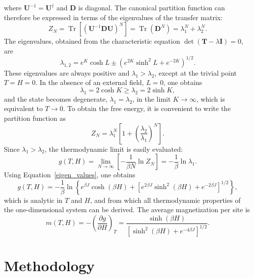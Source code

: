 \documentclass[a4paper]{article}
\begin{document}
where $\mathbf{U}^{-1}=\mathbf{U}^{\dagger}$ and $\mathbf{D}$ is diagonal. The canonical partition function can therefore be expressed in terms of the eigenvalues of the transfer matrix:
\begin{equation}
Z_N=\operatorname{Tr}\left[(\mathbf{U}^{-1}\mathbf{D}\mathbf{U})^N\right]=\operatorname{Tr}(\mathbf{D}^N)=\lambda_1^N+\lambda_2^N.
\end{equation}
The eigenvalues, obtained from the characteristic equation $\det(\mathbf{T}-\lambda\mathbf{I})=0$, are
\begin{equation}\label{eigen_values}
\lambda_{1,2}=e^K\cosh L\pm\left(e^{2K}\sinh^2L+e^{-2K}\right)^{1/2}.
\end{equation}
These eigenvalues are always positive and $\lambda_1>\lambda_2$, except at the trivial point $T=H=0$. In the absence of an external field, $L=0$, one obtains
\begin{equation}
\lambda_1=2\cosh K\geq \lambda_2=2\sinh K,
\end{equation}
and the state becomes degenerate, $\lambda_1=\lambda_2$, in the limit $K\to\infty$, which is equivalent to $T\to0$. To obtain the free energy, it is convenient to write the partition function as
\begin{equation}
Z_N=\lambda_1^N\left[1+\left(\frac{\lambda_2}{\lambda_1}\right)^N\right].
\end{equation}
Since $\lambda_1>\lambda_2$, the thermodynamic limit is easily evaluated:
\begin{equation}
g(T,H)=\lim_{N\to\infty}\left[-\frac{1}{\beta N}\ln Z_N\right]= -\frac{1}{\beta}\ln\lambda_1.
\end{equation}
Using Equation~\ref{eigen_values}, one obtains
\begin{equation}
g(T,H)=-\frac{1}{\beta}\ln\left\{e^{\beta J}\cosh(\beta H)+\left[e^{2\beta J}\sinh^2(\beta H)+e^{-2\beta J}\right]^{1/2}\right\},
\end{equation}
which is analytic in $T$ and $H$, and from which all thermodynamic properties of the one-dimensional system can be derived. The average magnetization per site is
\begin{equation}
m(T,H)=-\left(\frac{\partial g}{\partial H}\right)_T=\frac{\sinh(\beta H)}{\left[\sinh^2(\beta H)+e^{-4\beta J}\right]^{1/2}}.
\end{equation}

\section{Methodology}
\end{document}

